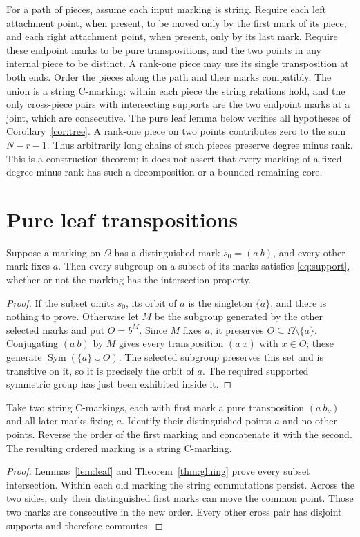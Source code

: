 \documentclass[a4paper,11pt]{article}
\newcommand{\Sym}{\operatorname{Sym}}
\begin{document}
For a path of pieces, assume each input marking is string. Require each
left attachment point, when present,
to be moved only by the first mark of its piece, and each right attachment
point, when present, only by its last mark. Require these endpoint marks
to be pure transpositions, and the two points in any internal piece to be
distinct. A rank-one piece may use its single transposition at both ends.
Order the pieces along the path and their marks compatibly. The union is a string C-marking: within each piece the
string relations hold, and the only cross-piece pairs with intersecting
supports are the two endpoint marks at a joint, which are consecutive.
The pure leaf lemma below verifies all hypotheses of Corollary~\ref{cor:tree}.
A rank-one piece on two points contributes zero to the sum $N-r-1$.
Thus arbitrarily long chains of such pieces preserve degree minus rank.
This is a construction theorem; it does not assert that every marking of a
fixed degree minus rank has such a decomposition or a bounded remaining core.

\section{Pure leaf transpositions}
\begin{lemma}\label{lem:leaf}
Suppose a marking on $\Omega$ has a distinguished mark
$s_0=(a\ b)$, and every other mark fixes $a$.
Then every subgroup on a subset of its marks satisfies
\eqref{eq:support}, whether or not the marking has the intersection property.
\end{lemma}
\begin{proof}
If the subset omits $s_0$, its orbit of $a$ is the singleton $\{a\}$,
and there is nothing to prove. Otherwise let $M$ be the subgroup generated
by the other selected marks and put $O=b^M$. Since $M$ fixes $a$, it
preserves $O\subseteq\Omega\setminus\{a\}$. Conjugating $(a\ b)$ by
$M$ gives every transposition $(a\ x)$ with $x\in O$; these generate
$\Sym(\{a\}\cup O)$. The selected subgroup preserves this set and is
transitive on it, so it is precisely the orbit of $a$. The required
supported symmetric group has just been exhibited inside it.
\end{proof}

\begin{corollary}\label{cor:string}
Take two string C-markings, each with first mark a pure transposition
$(a\ b_\nu)$ and all later marks fixing $a$. Identify their distinguished
points $a$ and no other points. Reverse the order of the first marking
and concatenate it with the second. The resulting ordered marking is a
string C-marking.
\end{corollary}
\begin{proof}
Lemmas~\ref{lem:leaf} and Theorem~\ref{thm:gluing} prove every subset
intersection. Within each old marking the string commutations persist.
Across the two sides, only their distinguished first marks can move the
common point. Those two marks are consecutive in the new order.
Every other cross pair has disjoint supports and therefore commutes.
\end{proof}
\end{document}

